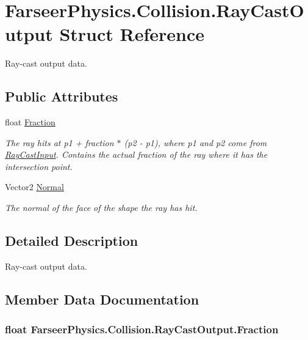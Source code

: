 \hypertarget{struct_farseer_physics_1_1_collision_1_1_ray_cast_output}{\section{Farseer\+Physics.\+Collision.\+Ray\+Cast\+Output Struct Reference}
\label{struct_farseer_physics_1_1_collision_1_1_ray_cast_output}
}


Ray-\/cast output data.  


\subsection*{Public Attributes}
\begin{DoxyCompactItemize}
\item 
float \hyperlink{struct_farseer_physics_1_1_collision_1_1_ray_cast_output_a894a417c1652d808611e100a9d03043e}{Fraction}
\begin{DoxyCompactList}\small\item\em The ray hits at p1 + fraction $\ast$ (p2 -\/ p1), where p1 and p2 come from \hyperlink{struct_farseer_physics_1_1_collision_1_1_ray_cast_input}{Ray\+Cast\+Input}. Contains the actual fraction of the ray where it has the intersection point. \end{DoxyCompactList}\item 
Vector2 \hyperlink{struct_farseer_physics_1_1_collision_1_1_ray_cast_output_a1a742e82430b2986b60ae8ce4f466419}{Normal}
\begin{DoxyCompactList}\small\item\em The normal of the face of the shape the ray has hit. \end{DoxyCompactList}\end{DoxyCompactItemize}


\subsection{Detailed Description}
Ray-\/cast output data. 



\subsection{Member Data Documentation}
\hypertarget{struct_farseer_physics_1_1_collision_1_1_ray_cast_output_a894a417c1652d808611e100a9d03043e}{
\subsubsection[{Fraction}]{\setlength{\rightskip}{0pt plus 5cm}float Farseer\+Physics.\+Collision.\+Ray\+Cast\+Output.\+Fraction}}\label{struct_farseer_physics_1_1_collision_1_1_ray_cast_output_a894a417c1652d808611e100a9d03043e}


